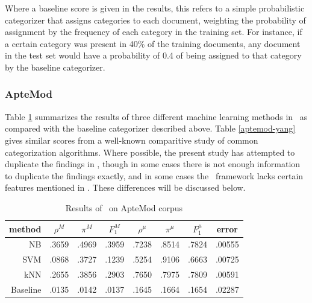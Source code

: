 Where a baseline score is given in the results, this refers to a
simple probabilistic categorizer that assigns categories to each
document, weighting the probability of assignment by the frequency of
each category in the training set.  For instance, if a certain
category was present in 40\% of the training documents, any document
in the test set would have a probability of 0.4 of being assigned to
that category by the baseline categorizer.  

\subsubsection{ApteMod}

Table \ref{aptemod-results} summarizes the results of three different
machine learning methods in \aicat\ as compared with the baseline
categorizer described above.  Table \ref{aptemod-yang} gives similar
scores from a well-known comparitive study of common categorization
algorithms.\cite{yang:99} Where possible, the present study has
attempted to duplicate the findings in \cite{yang:99}, though in some
cases there is not enough information to duplicate the findings
exactly, and in some cases the \aicat\ framework lacks certain
features mentioned in \cite{yang:99}.  These differences will be
discussed below.

\begin{table}
\begin{center}
\begin{tabular}{|r c c c c c c c|}
\hline
method    & $\rho^M$ & $\pi^M$ & $F_1^M$ & $\rho^\mu$ & $\pi^\mu$ & $F_1^\mu$ &   error \\
\hline
NB        &   .3659  &  .4969  &  .3959  &  .7238     &  .8514    &  .7824    &  .00555 \\
SVM       &   .0868  &  .3727  &  .1239  &  .5254     &  .9106    &  .6663    &  .00725 \\
kNN       &   .2655  &  .3856  &  .2903  &  .7650     &  .7975    &  .7809    &  .00591 \\
Baseline  &   .0135  &  .0142  &  .0137  &  .1645     &  .1664    &  .1654    &  .02287 \\
\hline
\end{tabular}
\end{center}
\caption{Results of \aicat\ on ApteMod corpus}
\label{aptemod-results}
\end{table}

